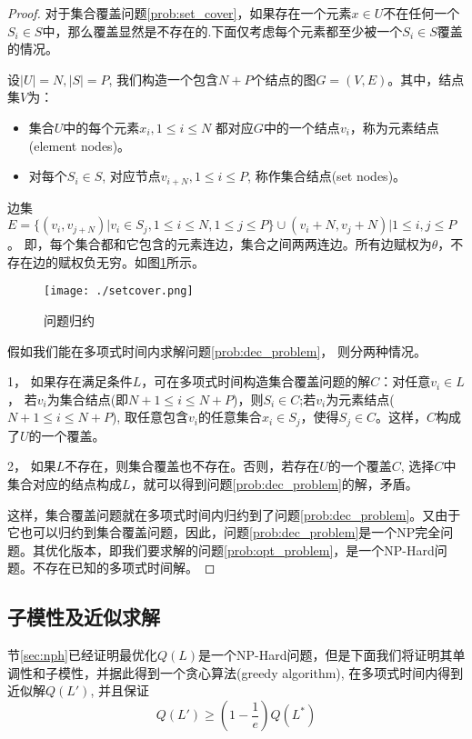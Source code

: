 \begin{proof}
对于集合覆盖问题\ref{prob:set_cover}，如果存在一个元素$x \in U$不在任何一个$S_i \in S$中，那么覆盖显然是不存在的.下面仅考虑每个元素都至少被一个$S_i \in S$覆盖的情况。

设$|U| = N, |S| = P$, 我们构造一个包含$N+P$个结点的图$G=(V,E)$。其中，结点集$V$为：
\begin{itemize}
\item 集合$U$中的每个元素$x_i, 1 \le i \le N $ 都对应$G$中的一个结点$v_i$，称为元素结点(element nodes)。
\item 对每个$S_i \in S$, 对应节点$v_{i+N}, 1 \le i \le P$, 称作集合结点(set nodes)。
\end{itemize}
边集$E=\{(v_i, v_{j+N}) | v_i \in S_j, 1\le i \le N, 1\le j \le P\} \cup {(v_i+N, v_j+N) | 1 \le i,j \le P}$。 即，每个集合都和它包含的元素连边，集合之间两两连边。所有边赋权为$\theta$，不存在边的赋权负无穷。如图\ref{fig:setcover}所示。
\begin{figure}[htbp]
\centering
\texttt{[image: ./setcover.png]}
\caption{问题归约}
\label{fig:setcover}
\end{figure}

假如我们能在多项式时间内求解问题\ref{prob:dec_problem}， 则分两种情况。

1， 如果存在满足条件$L$，可在多项式时间构造集合覆盖问题的解$C$：对任意$v_i \in L$， 若$v_i$为集合结点(即$N+1 \le i \le N+P$)，则$S_i \in C$;若$v_i$为元素结点($N+1 \le i \le N+P$), 取任意包含$v_i$的任意集合$x_i \in S_j$，使得$S_j \in C$。这样，$C$构成了$U$的一个覆盖。

2， 如果$L$不存在，则集合覆盖也不存在。否则，若存在$U$的一个覆盖$C$, 选择$C$中集合对应的结点构成$L$，就可以得到问题\ref{prob:dec_problem}的解，矛盾。

这样，集合覆盖问题就在多项式时间内归约到了问题\ref{prob:dec_problem}。又由于它也可以归约到集合覆盖问题，因此，问题\ref{prob:dec_problem}是一个NP完全问题。其优化版本，即我们要求解的问题\ref{prob:opt_problem}，是一个NP-Hard问题。不存在已知的多项式时间解。
\end{proof}

\subsection{子模性及近似求解}

节\ref{sec:nph}已经证明最优化$Q(L)$是一个NP-Hard问题，但是下面我们将证明其单调性和子模性，并据此得到一个贪心算法(greedy algorithm), 在多项式时间内得到近似解$Q(L')$, 并且保证
\[
	Q(L') \ge (1-\frac{1}{e}) Q(L^*)
\]

